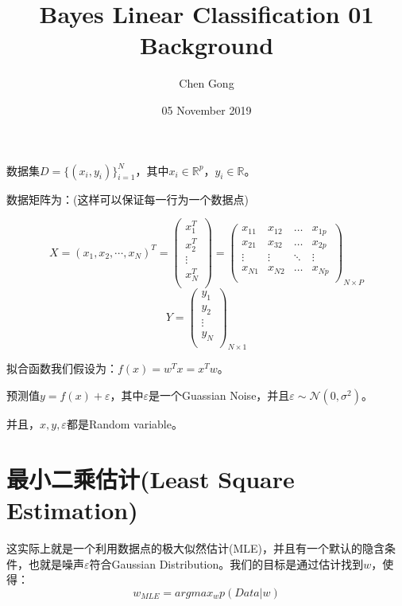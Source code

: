 \documentclass[a4paper]{article}
\title{Bayes Linear Classification 01 Background}
\author{Chen Gong}
\date{05 November 2019}
\begin{document}
\maketitle

数据集$D=\{(x_i,y_i)\}^{N}_{i=1}$，其中$x_i\in\mathbb{R}^{p}$，$y_i\in\mathbb{R}$。

数据矩阵为：(这样可以保证每一行为一个数据点)

\begin{equation}
    X=(x_1, x_2, \cdots, x_N)^T=
    \begin{pmatrix}
    x_1^T \\ 
    x_2^T \\
    \vdots\\
    x_N^T \\
    \end{pmatrix} =
    \begin{pmatrix}
    x_{11} & x_{12} & \dots & x_{1p}\\
    x_{21} & x_{32} & \dots & x_{2p}\\
    \vdots & \vdots & \ddots & \vdots\\
    x_{N1} & x_{N2} & \dots & x_{Np}\\
    \end{pmatrix}_{N\times P}
\end{equation}
\begin{equation}
    Y=
    \begin{pmatrix}
    y_1 \\ 
    y_2 \\
    \vdots\\
    y_N \\
    \end{pmatrix}_{N\times 1}
\end{equation}

拟合函数我们假设为：$f(x) = w^Tx = x^Tw$。

预测值$y=f(x)+\varepsilon$，其中$\varepsilon$是一个Guassian Noise，并且$\varepsilon \sim \mathcal{N}(0,\sigma^2)$。

并且，$x,y,\varepsilon$都是Random variable。

\section{最小二乘估计(Least Square Estimation)}
这实际上就是一个利用数据点的极大似然估计(MLE)，并且有一个默认的隐含条件，也就是噪声$\varepsilon$符合Gaussian Distribution。我们的目标是通过估计找到$w$，使得：
\begin{equation}
    w_{MLE} = argmax_w p(Data|w)
\end{equation}
\end{document}
